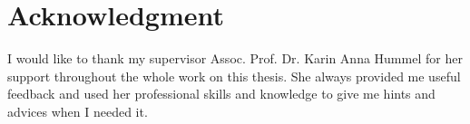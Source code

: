 \chapter*{Acknowledgment}

\ifx\manuscriptmode\undefined{}

I would like to thank my supervisor Assoc. Prof. Dr. Karin Anna Hummel for her support throughout the whole work on this thesis. She always provided me useful feedback and used her professional skills and knowledge to give me hints and advices when I needed it. 

\fi
